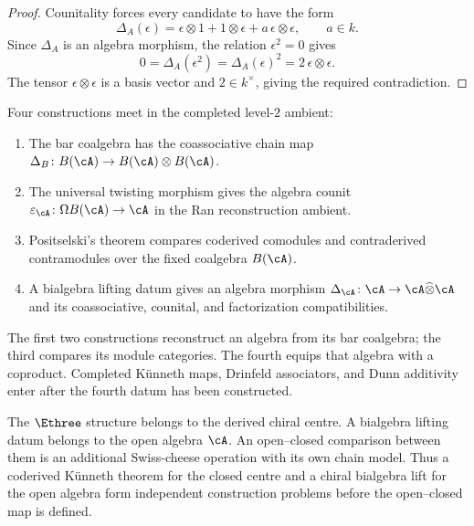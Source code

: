 \begin{proof}
Counitality forces every candidate to have the form
\[
 \Delta_A(\epsilon)
 =\epsilon\otimes1+1\otimes\epsilon
  +a\,\epsilon\otimes\epsilon,
 \qquad a\in k.
\]
Since $\Delta_A$ is an algebra morphism, the relation
$\epsilon^2=0$ gives
\[
 0=\Delta_A(\epsilon^2)=\Delta_A(\epsilon)^2
   =2\,\epsilon\otimes\epsilon.
\]
The tensor $\epsilon\otimes\epsilon$ is a basis vector and
$2\in k^\times$, giving the required contradiction.
\end{proof}

\begin{remark}
\label{rem:coderived-chiral-coproduct-structure}%
%
Four constructions meet in the completed level-$2$ ambient:
\begin{enumerate}[label=\textup{(\alph*)}]
\item The bar coalgebra has the coassociative chain map
$\Delta_B\colon B(\cA)\to B(\cA)\otimes B(\cA)$.
\item The universal twisting morphism gives the algebra counit
$\varepsilon_{\cA}\colon\Omega B(\cA)\to\cA$ in the Ran
reconstruction ambient.
\item Positselski's theorem compares coderived comodules and
contraderived contramodules over the fixed coalgebra $B(\cA)$.
\item A bialgebra lifting datum gives an algebra morphism
$\Delta_{\cA}\colon\cA\to\cA\widehat\otimes\cA$ and its
coassociative, counital, and factorization compatibilities.
\end{enumerate}
The first two constructions reconstruct an algebra from its bar
coalgebra; the third compares its module categories.  The fourth
equips that algebra with a coproduct.  Completed K\"unneth maps,
Drinfeld associators, and
Dunn additivity enter after the fourth datum has been constructed.
\end{remark}

\begin{remark}
\label{rem:coderived-coproduct-vs-e3}%
%
The $\Ethree$ structure belongs to the derived chiral centre.  A
bialgebra lifting datum belongs to the open algebra $\cA$.  An
open--closed comparison between them is an additional Swiss-cheese
operation with its own chain model.  Thus a coderived K\"unneth theorem
for the closed centre and a chiral bialgebra lift for the open algebra
form independent construction problems before the open--closed map is
defined.
\end{remark}

